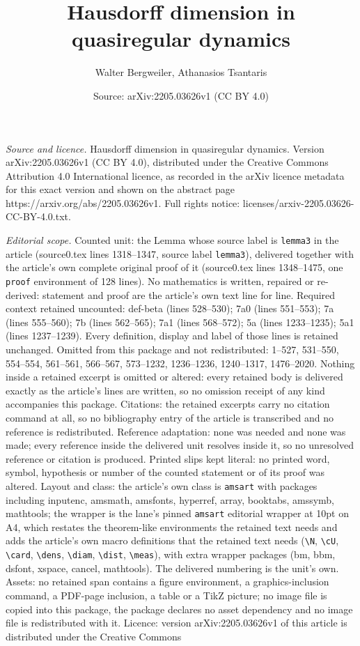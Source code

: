 \documentclass[10pt,a4paper]{amsart}
\title[Hausdorff dimension in quasiregular dynamics]{Hausdorff dimension in quasiregular dynamics}
\author{Walter Bergweiler, Athanasios Tsantaris}
\date{Source: arXiv:2205.03626v1 (CC BY 4.0)}
\begin{document}
\maketitle

\noindent\emph{Source and licence.} Hausdorff dimension in quasiregular dynamics. Version arXiv:2205.03626v1 (CC BY 4.0), distributed under the Creative Commons Attribution 4.0 International licence, as recorded in the arXiv licence metadata for this exact version and shown on the abstract page https://arxiv.org/abs/2205.03626v1. Full rights notice: licenses/arxiv-2205.03626-CC-BY-4.0.txt.\par\smallskip

\noindent\textit{Editorial scope.} Counted unit: the Lemma whose source label is \texttt{lemma3} in the article (source0.tex lines 1318--1347, source label \texttt{lemma3}), delivered together with the article's own complete original proof of it (source0.tex lines 1348--1475, one \texttt{proof} environment of 128 lines). No mathematics is written, repaired or re-derived: statement and proof are the article's own text line for line. Required context retained uncounted: def-beta (lines 528--530); 7a0 (lines 551--553); 7a (lines 555--560); 7b (lines 562--565); 7a1 (lines 568--572); 5a (lines 1233--1235); 5a1 (lines 1237--1239). Every definition, display and label of those lines is retained unchanged. Omitted from this package and not redistributed: 1--527, 531--550, 554--554, 561--561, 566--567, 573--1232, 1236--1236, 1240--1317, 1476--2020. Nothing inside a retained excerpt is omitted or altered: every retained body is delivered exactly as the article's lines are written, so no omission receipt of any kind accompanies this package. Citations: the retained excerpts carry no citation command at all, so no bibliography entry of the article is transcribed and no reference is redistributed. Reference adaptation: none was needed and none was made; every reference inside the delivered unit resolves inside it, so no unresolved reference or citation is produced. Printed slips kept literal: no printed word, symbol, hypothesis or number of the counted statement or of its proof was altered. Layout and class: the article's own class is \texttt{amsart} with packages including inputenc, amsmath, amsfonts, hyperref, array, booktabs, amssymb, mathtools; the wrapper is the lane's pinned \texttt{amsart} editorial wrapper at 10pt on A4, which restates the theorem-like environments the retained text needs and adds the article's own macro definitions that the retained text needs (\texttt{\textbackslash N}, \texttt{\textbackslash cU}, \texttt{\textbackslash card}, \texttt{\textbackslash dens}, \texttt{\textbackslash diam}, \texttt{\textbackslash dist}, \texttt{\textbackslash meas}), with extra wrapper packages (bm, bbm, dsfont, xspace, cancel, mathtools). The delivered numbering is the unit's own. Assets: no retained span contains a figure environment, a graphics-inclusion command, a PDF-page inclusion, a table or a TikZ picture; no image file is copied into this package, the package declares no asset dependency and no image file is redistributed with it. Licence: version arXiv:2205.03626v1 of this article is distributed under the Creative Commons 
\end{document}

